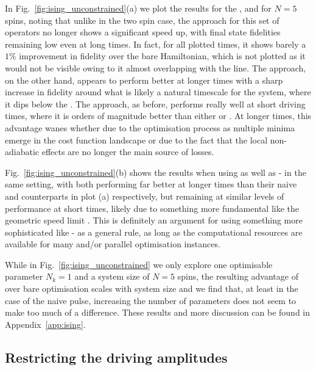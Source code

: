 In Fig.~\ref{fig:ising_unconstrained}(a) we plot the results for the  ,  and  for $N=5$ spins, noting that unlike in the two spin case, the  approach for this set of operators no longer shows a significant speed up, with final state fidelities remaining low even at long times. In fact, for all plotted times, it shows barely a $1\%$ improvement in fidelity over the bare Hamiltonian, which is not plotted as it would not be visible owing to it almost overlapping with the  line. The  approach, on the other hand, appears to perform better at longer times with a sharp increase in fidelity around what is likely a natural timescale for the system, where it dips below the . The  approach, as before, performs really well at short driving times, where it is orders of magnitude better than either  or . At longer times, this advantage wanes whether due to the optimisation process as multiple minima emerge in the cost function landscape or due to the fact that the local non-adiabatic effects are no longer the main source of losses. 

Fig.~\ref{fig:ising_unconstrained}(b) shows the results when using  as well as - in the same setting, with both performing far better at longer times than their naive  and  counterparts in plot (a) respectively, but remaining at similar levels of performance at short times, likely due to something more fundamental like the geometric speed limit \cite{bukov_geometric_2019}. This is definitely an argument for using something more sophisticated like - as a general rule, as long as the computational resources are available for many and/or parallel optimisation instances.

While in Fig.~\ref{fig:ising_unconstrained} we only explore one optimisable parameter $N_k = 1$ and a system size of $N=5$ spins, the resulting advantage of  over bare optimisation scales with system size and we find that, at least in the case of the naive pulse, increasing the number of parameters does not seem to make too much of a difference. These results and more discussion can be found in Appendix~\ref{app:ising}.

\subsection{Restricting the driving amplitudes}\label{sec:6.2.1_restricting_amps}

